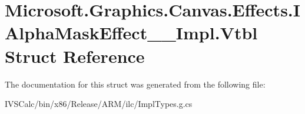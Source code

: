 \hypertarget{struct_microsoft_1_1_graphics_1_1_canvas_1_1_effects_1_1_i_alpha_mask_effect_____impl_1_1_vtbl}{}\section{Microsoft.\+Graphics.\+Canvas.\+Effects.\+I\+Alpha\+Mask\+Effect\+\_\+\+\_\+\+Impl.\+Vtbl Struct Reference}
\label{struct_microsoft_1_1_graphics_1_1_canvas_1_1_effects_1_1_i_alpha_mask_effect_____impl_1_1_vtbl}


The documentation for this struct was generated from the following file\+:\begin{DoxyCompactItemize}
\item 
I\+V\+S\+Calc/bin/x86/\+Release/\+A\+R\+M/ilc/Impl\+Types.\+g.\+cs\end{DoxyCompactItemize}
